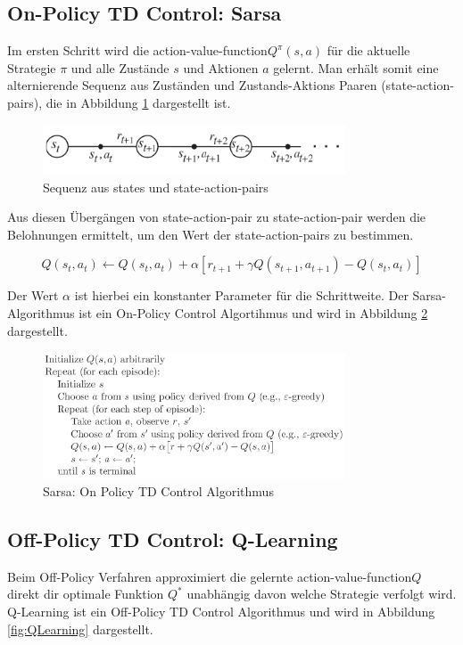 \documentclass[10pt]{scrartcl}
\begin{document}
\subsection{On-Policy TD Control: Sarsa}

Im ersten Schritt wird die \glqq action-value-function\grqq\xspace $Q^{\pi}(s,a)$ für die aktuelle Strategie $\pi$ und alle Zustände $s$ und Aktionen $a$ gelernt. Man erhält somit eine alternierende Sequenz aus Zuständen und Zustands-Aktions Paaren (state-action-pairs), die in Abbildung \ref{fig:SA-Pairs} dargestellt ist.

\begin{figure}[htbp]
	\centering	\includegraphics[width=0.8\textwidth]{Bilder/OnPolicy.png}
	\caption{Sequenz aus states und state-action-pairs}
	\label{fig:SA-Pairs}
\end{figure}

Aus diesen Übergängen von state-action-pair zu state-action-pair werden die Belohnungen ermittelt, um den Wert der state-action-pairs zu bestimmen.

\begin{equation}
Q(s_{t},a_{t}) \leftarrow Q(s_{t},a_{t}) + \alpha [r_{t+1} + \gamma Q(s_{t+1},a_{t+1}) - Q(s_{t},a_{t})]
\end{equation}

Der Wert $\alpha$ ist hierbei ein konstanter Parameter für die Schrittweite. Der Sarsa-Algorithmus ist ein On-Policy Control Algortihmus und wird in Abbildung \ref{fig:Sarsa} dargestellt.

\begin{figure}[htbp]
	\centering	\includegraphics[width=0.8\textwidth]{Bilder/Sarsa.png}
	\caption{Sarsa: On Policy TD Control Algorithmus}
	\label{fig:Sarsa}
\end{figure}


\subsection{Off-Policy TD Control: Q-Learning}
Beim Off-Policy Verfahren approximiert die gelernte \glqq action-value-function\grqq\xspace $Q$  direkt dir optimale Funktion $Q^{*}$ unabhängig davon welche Strategie verfolgt wird. Q-Learning ist ein Off-Policy TD Control Algorithmus und wird in Abbildung \ref{fig:QLearning} dargestellt.
 
\end{document}
